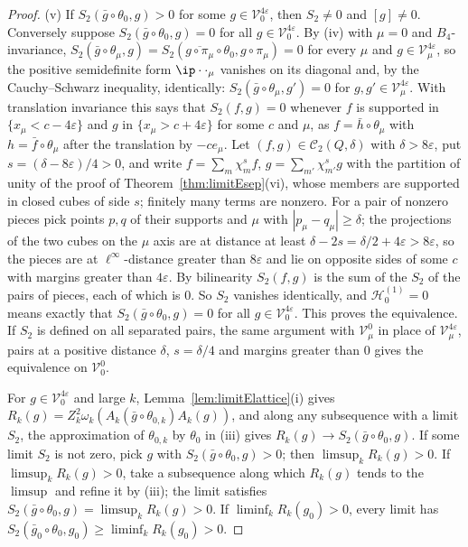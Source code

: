 \begin{proof}
(v) If $S_2(\bar g\circ\theta_0,g)>0$ for some $g\in\mathcal V^{4
\varepsilon}_0$, then $S_2\ne0$ and $[g]\ne0$. Conversely suppose
$S_2(\bar g\circ\theta_0,g)=0$ for all $g\in\mathcal V^{4\varepsilon}_0$.
By (iv) with $\mu=0$ and $B_4$-invariance, $S_2(\bar g\circ\theta_\mu,g)=
S_2(\overline{g\circ\pi_\mu}\circ\theta_0,g\circ\pi_\mu)=0$ for every
$\mu$ and $g\in\mathcal V^{4\varepsilon}_\mu$, so the positive semidefinite
form $\ip\cdot\cdot_\mu$ vanishes on its diagonal and, by the Cauchy--Schwarz
inequality, identically: $S_2(\bar g\circ\theta_\mu,g')=0$ for $g,g'\in
\mathcal V^{4\varepsilon}_\mu$. With translation invariance this says that
$S_2(f,g)=0$ whenever $f$ is supported in $\{x_\mu<c-4\varepsilon\}$ and $g$
in $\{x_\mu>c+4\varepsilon\}$ for some $c$ and $\mu$, as $f=\bar h\circ
\theta_\mu$ with $h=\bar f\circ\theta_\mu$ after the translation by $-ce_\mu$.
Let $(f,g)\in\mathcal C_2(Q,\delta)$ with $\delta>8\varepsilon$, put
$s=(\delta-8\varepsilon)/4>0$, and write $f=\sum_m\chi^s_mf$, $g=\sum_{m'}
\chi^s_{m'}g$ with the partition of unity of the proof of
Theorem~\ref{thm:limitEsep}(vi), whose members are supported in closed cubes
of side $s$; finitely many terms are nonzero. For a pair of nonzero pieces
pick points $p,q$ of their supports and $\mu$ with $|p_\mu-q_\mu|\ge\delta$;
the projections of the two cubes on the $\mu$ axis are at distance at least
$\delta-2s=\delta/2+4\varepsilon>8\varepsilon$, so the pieces are at
$\ell^\infty$-distance greater than $8\varepsilon$ and lie on opposite sides
of some $c$ with margins greater than $4\varepsilon$. By bilinearity $S_2(f,
g)$ is the sum of the $S_2$ of the pairs of pieces, each of which is $0$.
So $S_2$ vanishes identically, and $\mathcal H^{(1)}_0=0$ means exactly
that $S_2(\bar g\circ\theta_0,g)=0$ for all $g\in\mathcal V^{4\varepsilon}
_0$. This proves the equivalence. If $S_2$ is defined on all separated
pairs, the same argument with $\mathcal V^0_\mu$ in place of
$\mathcal V^{4\varepsilon}_\mu$, pairs at a positive distance $\delta$,
$s=\delta/4$ and margins greater than $0$ gives the equivalence on
$\mathcal V^0_0$.

For $g\in\mathcal V^{4\varepsilon}_0$ and large $k$, Lemma~\ref{lem:limitElattice}(i)
gives $R_k(g)=Z_k^2\omega_k(A_k(\bar g\circ\theta_{0,k})A_k(g))$, and along
any subsequence with a limit $S_2$, the approximation of $\theta_{0,k}$ by
$\theta_0$ in (iii) gives $R_k(g)\to S_2(\bar g\circ\theta_0,g)$. If some
limit $S_2$ is not zero, pick $g$ with $S_2(\bar g\circ\theta_0,g)>0$; then
$\limsup_kR_k(g)>0$. If $\limsup_kR_k(g)>0$, take a subsequence along which
$R_k(g)$ tends to the $\limsup$ and refine it by (iii); the limit satisfies
$S_2(\bar g\circ\theta_0,g)=\limsup_kR_k(g)>0$. If $\liminf_kR_k(g_0)>0$,
every limit has $S_2(\bar g_0\circ\theta_0,g_0)\ge\liminf_kR_k(g_0)>0$.


\end{proof}
